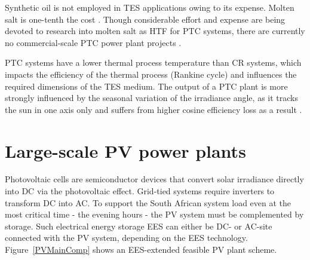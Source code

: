 Synthetic oil is not employed in \ac{TES} applications owing to its expense. Molten salt is one-tenth the cost \cite{Gil2010}. Though considerable effort and expense are being devoted to research into molten salt as \ac{HTF} for \ac{PTC} systems, there are currently no commercial-scale \ac{PTC} power plant projects \cite{Maccari2015}.

%

\ac{PTC} systems have a lower thermal process temperature than \ac{CR} systems, which impacts the efficiency of the thermal process (Rankine cycle) and influences the required dimensions of the \ac{TES} medium. The output of a \ac{PTC} plant is more strongly influenced by the seasonal variation of the irradiance angle, as it tracks the sun in one axis only and suffers from higher cosine efficiency loss as a result \cite{Jorgenson2013}.

\section{Large-scale PV power plants}\label{Large scale photo voltaic (PV) power plants}

Photovoltaic cells are semiconductor devices that convert solar irradiance directly into \ac{DC} via the photovoltaic effect.
Grid-tied systems require inverters to transform \ac{DC} into \ac{AC}. To support the South African system load even at the most critical time - the evening hours - the PV system must be complemented by storage. Such electrical energy storage \ac{EES} can either be \ac{DC}- or \ac{AC}-site connected with the PV system, depending on the \ac{EES} technology. Figure~\ref{PVMainComp} shows an \ac{EES}-extended feasible \ac{PV} plant scheme.


